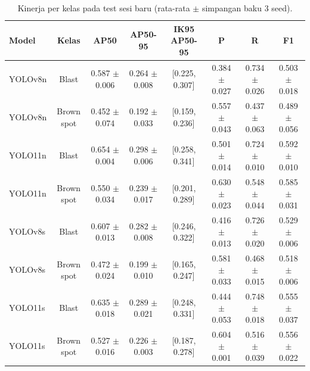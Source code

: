 \begin{table}[!t]
\centering
\caption{Kinerja per kelas pada test sesi baru (rata-rata $\pm$ simpangan baku 3 seed).}
\label{tab:per_kelas_sesi_baru}
\footnotesize
\begin{tabular}{lccccccc}
\hline
\textbf{Model} & \textbf{Kelas} & \textbf{AP50} & \textbf{AP50-95} & \textbf{IK95 AP50-95} & \textbf{P} & \textbf{R} & \textbf{F1} \\
\hline
YOLOv8n & Blast & 0.587 $\pm$ 0.006 & 0.264 $\pm$ 0.008 & [0.225, 0.307] & 0.384 $\pm$ 0.027 & 0.734 $\pm$ 0.026 & 0.503 $\pm$ 0.018 \\
YOLOv8n & Brown spot & 0.452 $\pm$ 0.074 & 0.192 $\pm$ 0.033 & [0.159, 0.236] & 0.557 $\pm$ 0.043 & 0.437 $\pm$ 0.063 & 0.489 $\pm$ 0.056 \\
YOLO11n & Blast & 0.654 $\pm$ 0.004 & 0.298 $\pm$ 0.006 & [0.258, 0.341] & 0.501 $\pm$ 0.014 & 0.724 $\pm$ 0.010 & 0.592 $\pm$ 0.010 \\
YOLO11n & Brown spot & 0.550 $\pm$ 0.034 & 0.239 $\pm$ 0.017 & [0.201, 0.289] & 0.630 $\pm$ 0.023 & 0.548 $\pm$ 0.044 & 0.585 $\pm$ 0.031 \\
YOLOv8s & Blast & 0.607 $\pm$ 0.013 & 0.282 $\pm$ 0.008 & [0.246, 0.322] & 0.416 $\pm$ 0.013 & 0.726 $\pm$ 0.020 & 0.529 $\pm$ 0.006 \\
YOLOv8s & Brown spot & 0.472 $\pm$ 0.024 & 0.199 $\pm$ 0.010 & [0.165, 0.247] & 0.581 $\pm$ 0.033 & 0.468 $\pm$ 0.015 & 0.518 $\pm$ 0.006 \\
YOLO11s & Blast & 0.635 $\pm$ 0.018 & 0.289 $\pm$ 0.021 & [0.248, 0.331] & 0.444 $\pm$ 0.053 & 0.748 $\pm$ 0.018 & 0.555 $\pm$ 0.037 \\
YOLO11s & Brown spot & 0.527 $\pm$ 0.016 & 0.226 $\pm$ 0.003 & [0.187, 0.278] & 0.604 $\pm$ 0.001 & 0.516 $\pm$ 0.039 & 0.556 $\pm$ 0.022 \\
\hline
\end{tabular}
\end{table}
